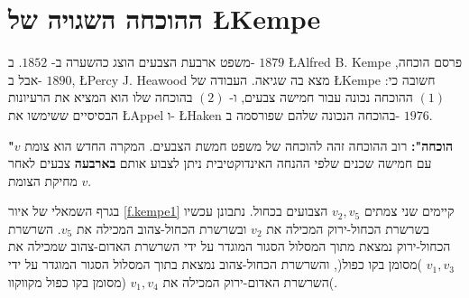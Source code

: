 

\section{ההוכחה השגויה של
\L{Kempe}}
\label{s.kempe}

משפט ארבעת הצבעים הוצג כהשערה ב-%
$1852$.
ב-%
$1879$
\L{Alfred B. Kempe}
פרסם הוכחה, אבל ב-%
$1890$,
\L{Percy J. Heawood}
מצא בה שגיאה. העבודה של
\L{Kempe}
חשובה כי: 
$(1)$
ההוכחה נכונה עבור חמישה צבעים, ו-%
$(2)$
בהוכחה שלו הוא המציא את הרעיונות הבסיסיים ששימשו את
\L{Appel}
ו-%
\L{Haken}
בהוכחה הנכונה שלהם שפורסמה ב-%
$1976$.

\textbf{"הוכחה":}
רוב ההוכחה זהה להוכחה של משפט חמשת הצבעים. המקרה החדש הוא צומת 
$v$
עם חמישה שכנים שלפי ההנחה האינדוקטיבית ניתן לצבוע אותם
\textbf{בארבעה}
צבעים לאחר מחיקת הצומת
$v$.

בגרף השמאלי של איור %
\ref{f.kempe1}
קיימים שני צמתים
$v_2,v_5$
הצבועים בכחול. נתבונן עכשיו בשרשרת הכחול-ירוק המכילה את 
$v_2$
ובשרשרת הכחול-צהוב המכילה את
$v_5$.
השרשרת הכחול-ירוק נמצאת מתוך המסלול הסגור המוגדר על ידי השרשרת האדום-צהוב שמכילה את
$v_1,v_3$
)מסומן בקו כפול(,
והשרשרת הכחול-צהוב נמצאת בתוך המסלול הסגור המוגדר על ידי השרשרת האדום-ירוק המכילה את
$v_1,v_4$
(מסומן בקו כפול מקווקוו(.

